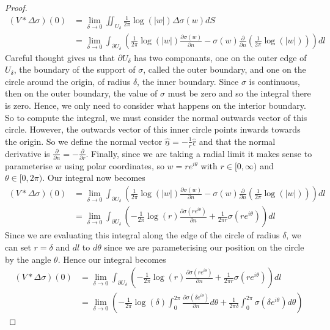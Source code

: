 \documentclass[11pt]{report}
\theoremstyle{definition}
\begin{document}
\begin{proof}
\begin{align*}
    (V * \Delta \sigma)(0) &= \lim_{\delta \rightarrow 0} \iint_{U_{\delta}} \frac{1}{2\pi}\log(|w|)\Delta\sigma(w) dS \\
    &= \lim_{\delta \rightarrow 0} \int_{\partial U_{\delta}}\left(\frac{1}{2\pi}\log(|w|)\frac{\partial \sigma(w)}{\partial n} - \sigma(w)\frac{\partial}{\partial n}\left(\frac{1}{2\pi}\log(|w|)\right)\right)dl
  \end{align*}
  Careful thought gives us that $\partial U_{\delta}$ has two componants, one on the outer edge of $U_{\delta}$, the boundary of the support of $\sigma$, called the outer boundary, and one on the circle around the origin, of radius $\delta$, the inner boundary. Since $\sigma$ is continuous, then on the outer boundary, the value of $\sigma$ must be zero and so the integral there is zero. Hence, we only need to consider what happens on the interior boundary. So to compute the integral, we must consider the normal outwards vector of this circle. However, the outwards vector of this inner circle points inwards towards the origin. So we define the normal vector $\hat{\underline{n}}= -\frac{1}{r}\hat{\underline{r}}$ and that the normal derivative is $\frac{\partial}{\partial n} = -\frac{\partial}{\partial r}$.
  Finally, since we are taking a radial limit it makes sense to parameterise $w$ using polar coordinates, so $w=re^{i\theta}$ with $r\in [0, \infty)$ and $\theta \in [0, 2\pi)$. Our integral now becomes
  \begin{align*}
    (V * \Delta \sigma)(0) &= \lim_{\delta \rightarrow 0} \int_{\partial U_{\delta}}\left(\frac{1}{2\pi}\log(|w|)\frac{\partial \sigma(w)}{\partial n} - \sigma(w)\frac{\partial}{\partial n}\left(\frac{1}{2\pi}\log(|w|)\right)\right)dl \\
    &= \lim_{\delta \rightarrow 0} \int_{\partial U_{\delta}}\left( -\frac{1}{2\pi}\log(r)\frac{\partial \sigma(re^{i\theta})}{\partial n} + \frac{1}{2\pi r}\sigma(re^{i\theta})\right)dl
  \end{align*}
  Since we are evaluating this integral along the edge of the circle of radius $\delta$, we can set $r=\delta$ and $dl$ to $d\theta$ since we are parameterising our position on the circle by the angle $\theta$. Hence our integral becomes
  \begin{align*}
    (V * \Delta \sigma)(0) &= \lim_{\delta \rightarrow 0} \int_{\partial U_{\delta}}\left( -\frac{1}{2\pi}\log(r)\frac{\partial \sigma(re^{i\theta})}{\partial n} + \frac{1}{2\pi r}\sigma(re^{i\theta})\right)dl \\
    &= \lim_{\delta \rightarrow 0} \left( -\frac{1}{2\pi}\log(\delta) \int_{0}^{2\pi} \frac{\partial \sigma(\delta e^{i\theta})}{\partial n} d\theta + \frac{1}{2\pi \delta}\int_{0}^{2\pi}\sigma(\delta e^{i\theta})d\theta\right)

\end{align*}
\end{proof}
\end{document}
